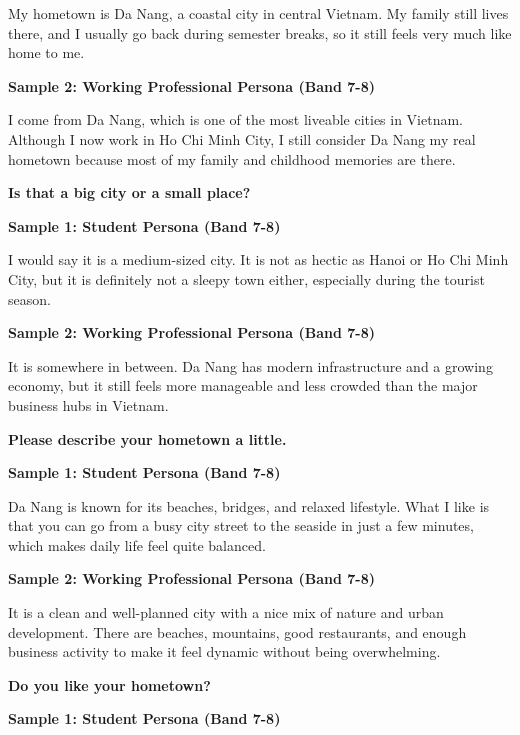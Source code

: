 My hometown is Da Nang, a coastal city in central Vietnam. My family still lives there, and I usually go back during semester breaks, so it still feels very much like home to me.

\textbf{Sample 2: Working Professional Persona (Band 7-8)}

I come from Da Nang, which is one of the most liveable cities in Vietnam. Although I now work in Ho Chi Minh City, I still consider Da Nang my real hometown because most of my family and childhood memories are there.

\separator

\begin{ieltsquestion}
\textbf{Is that a big city or a small place?}
\end{ieltsquestion}
\textbf{Sample 1: Student Persona (Band 7-8)}

I would say it is a medium-sized city. It is not as hectic as Hanoi or Ho Chi Minh City, but it is definitely not a sleepy town either, especially during the tourist season.

\textbf{Sample 2: Working Professional Persona (Band 7-8)}

It is somewhere in between. Da Nang has modern infrastructure and a growing economy, but it still feels more manageable and less crowded than the major business hubs in Vietnam.

\separator

\begin{ieltsquestion}
\textbf{Please describe your hometown a little.}
\end{ieltsquestion}
\textbf{Sample 1: Student Persona (Band 7-8)}

Da Nang is known for its beaches, bridges, and relaxed lifestyle. What I like is that you can go from a busy city street to the seaside in just a few minutes, which makes daily life feel quite balanced.

\textbf{Sample 2: Working Professional Persona (Band 7-8)}

It is a clean and well-planned city with a nice mix of nature and urban development. There are beaches, mountains, good restaurants, and enough business activity to make it feel dynamic without being overwhelming.

\separator

\begin{ieltsquestion}
\textbf{Do you like your hometown?}
\end{ieltsquestion}
\textbf{Sample 1: Student Persona (Band 7-8)}

